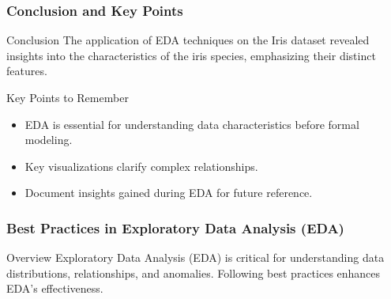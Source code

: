 \documentclass[aspectratio=169]{beamer}
\begin{document}
\begin{frame}
    \frametitle{Conclusion and Key Points}
    \begin{block}{Conclusion}
        The application of EDA techniques on the Iris dataset revealed insights into the characteristics of the iris species, emphasizing their distinct features.
    \end{block}

    \begin{block}{Key Points to Remember}
        \begin{itemize}
            \item EDA is essential for understanding data characteristics before formal modeling.
            \item Key visualizations clarify complex relationships.
            \item Document insights gained during EDA for future reference.
        \end{itemize}
    \end{block}
\end{frame}

\begin{frame}[fragile]
    \frametitle{Best Practices in Exploratory Data Analysis (EDA)}
    \begin{block}{Overview}
        Exploratory Data Analysis (EDA) is critical for understanding data distributions, relationships, and anomalies. Following best practices enhances EDA's effectiveness.
    \end{block}
\end{frame}
\end{document}
